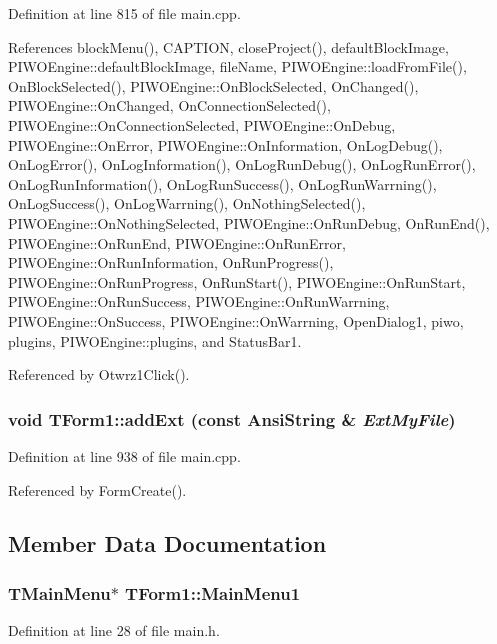 Definition at line 815 of file main.cpp.

References blockMenu(), CAPTION, closeProject(), defaultBlockImage, PIWOEngine::defaultBlockImage, fileName, PIWOEngine::loadFromFile(), OnBlockSelected(), PIWOEngine::OnBlockSelected, OnChanged(), PIWOEngine::OnChanged, OnConnectionSelected(), PIWOEngine::OnConnectionSelected, PIWOEngine::OnDebug, PIWOEngine::OnError, PIWOEngine::OnInformation, OnLogDebug(), OnLogError(), OnLogInformation(), OnLogRunDebug(), OnLogRunError(), OnLogRunInformation(), OnLogRunSuccess(), OnLogRunWarrning(), OnLogSuccess(), OnLogWarrning(), OnNothingSelected(), PIWOEngine::OnNothingSelected, PIWOEngine::OnRunDebug, OnRunEnd(), PIWOEngine::OnRunEnd, PIWOEngine::OnRunError, PIWOEngine::OnRunInformation, OnRunProgress(), PIWOEngine::OnRunProgress, OnRunStart(), PIWOEngine::OnRunStart, PIWOEngine::OnRunSuccess, PIWOEngine::OnRunWarrning, PIWOEngine::OnSuccess, PIWOEngine::OnWarrning, OpenDialog1, piwo, plugins, PIWOEngine::plugins, and StatusBar1.

Referenced by Otwrz1Click().\hypertarget{classTForm1_579dfded9c383d2fd684e2405dc6371b}{
\subsubsection[addExt]{\setlength{\rightskip}{0pt plus 5cm}void TForm1::addExt (const AnsiString \& {\em ExtMyFile})}}
\label{classTForm1_579dfded9c383d2fd684e2405dc6371b}




Definition at line 938 of file main.cpp.

Referenced by FormCreate().

\subsection{Member Data Documentation}
\hypertarget{classTForm1_fb129674fc9747697ab1ec4939462c70}{
\subsubsection[MainMenu1]{\setlength{\rightskip}{0pt plus 5cm}TMainMenu$\ast$ {\bf TForm1::MainMenu1}}}
\label{classTForm1_fb129674fc9747697ab1ec4939462c70}




Definition at line 28 of file main.h.

